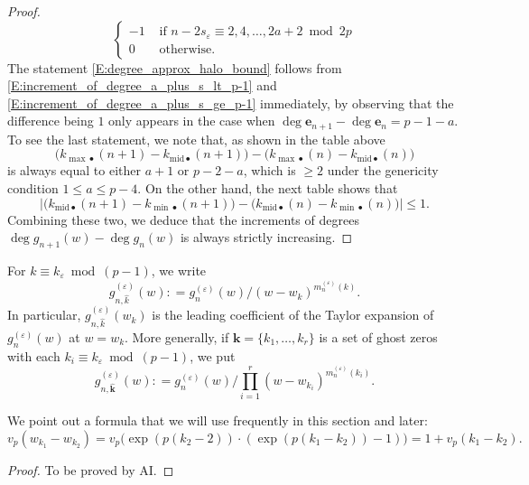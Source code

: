 \begin{proof}
$$\begin{cases}
    -1 & \textrm{ if } n- 2s_{\varepsilon} \equiv 2, 4, \dots, 2a+2 \bmod{2p}
    \\
    0 & \textrm{ otherwise.}
    \end{cases}
    $$
    The statement \eqref{E:degree_approx_halo_bound} follows from \eqref{E:increment_of_degree_a_plus_s_lt_p-1} and \eqref{E:increment_of_degree_a_plus_s_ge_p-1} immediately, by observing that the difference being $1$ only appears in the case when $\deg {\mathbf{e}}_{n+1}-\deg {\mathbf{e}}_n = p-1-a$.
    To see the last statement, we note that, as shown in the table above
    $$\big( k_{{\max}\bullet}(n+1) - k_{{\mathrm{mid}}\bullet}(n+1)\big) - \big(  k_{{\max}\bullet}(n) - k_{{\mathrm{mid}}\bullet}(n)\big)$$ is always equal to either $a+1$ or $p-2-a$, which is $\geq 2$ under the genericity condition $1\leq a \leq p-4$. On the other hand, the next table shows that
    $$
    \Big|\big(k_{{{\mathrm{mid}}}\bullet}(n+1) - k_{{\min}\bullet}(n+1)\big) - \big(  k_{{{\mathrm{mid}}}\bullet}(n) - k_{{\min}\bullet}(n)\big)\Big| \leq 1.
    $$
    Combining these two, we deduce that the increments of degrees $\deg g_{n+1}(w)-\deg g_n(w)$ is always strictly increasing.
\end{proof}

\begin{notation}
    \label{N:gnhatk}
    For $k \equiv k_\varepsilon \bmod {(p-1)}$, we write
    $$
    g^{(\varepsilon)}_{n,\hat k}(w): = g_n^{(\varepsilon)}(w) \big/ (w-w_k)^{m_n^{(\varepsilon)}(k)}.
    $$
    In particular, $g^{(\varepsilon)}_{n,\hat k}(w_k)$ is the leading coefficient of the Taylor expansion of $g_n^{(\varepsilon)}(w)$ at $w=w_k$.
    More generally, if ${\mathbf{k}}= \{k_1, \dots, k_r\}$ is a set of ghost zeros with each $k_i \equiv k_\varepsilon \bmod (p-1)$, we put
    $$
    g^{(\varepsilon)}_{n,\hat {{\mathbf{k}}}}(w): = g_n^{(\varepsilon)}(w) \big/ \prod_{i=1}^r(w-w_{k_i})^{m_n^{(\varepsilon)}(k_i)}.
    $$
\end{notation}

\begin{lemma}
    \label{E:vp_of_k1-k2}
    We point out a formula that we will use frequently in this section and later:
    \begin{equation}
    v_p(w_{k_1} - w_{k_2}) = v_p\big(\exp(p(k_2-2)) \cdot (\exp(p(k_1-k_2))-1)\big) =  1+ v_p(k_1-k_2).
    \end{equation}
\end{lemma}

\begin{proof}
    To be proved by AI.
\end{proof}


